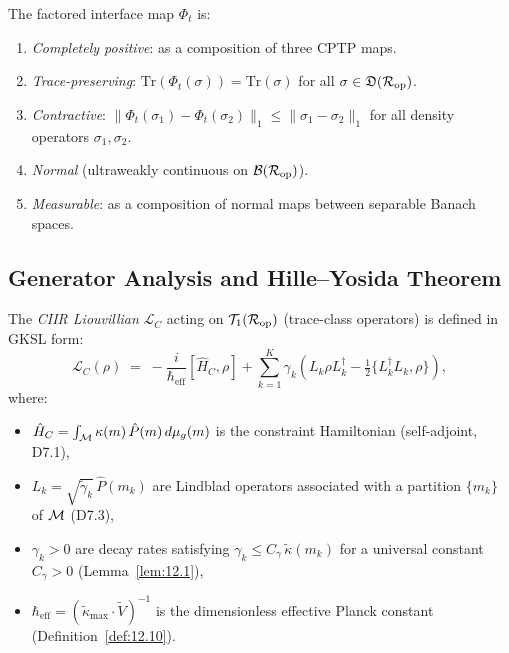 \begin{definition}\label{def:12.2}
The factored interface map $\Phi_t$ is:
\begin{enumerate}
  \item \emph{Completely positive}: as a composition of three CPTP maps.
  \item \emph{Trace-preserving}: $\mathrm{Tr}(\Phi_t(\sigma)) = \mathrm{Tr}(\sigma)$
    for all $\sigma \in \mathfrak{D}(\mathcal{R}_{\mathrm{op}})$.
  \item \emph{Contractive}: $\|\Phi_t(\sigma_1) - \Phi_t(\sigma_2)\|_1
    \leq \|\sigma_1 - \sigma_2\|_1$ for all density operators $\sigma_1, \sigma_2$.
  \item \emph{Normal} (ultraweakly continuous on $\mathcal{B}(\mathcal{R}_{\mathrm{op}})$).
  \item \emph{Measurable}: as a composition of normal maps between
    separable Banach spaces.
\end{enumerate}
\end{definition}

\subsection{Generator Analysis and Hille--Yosida Theorem}

\begin{definition}\label{def:12.3}
The \emph{CIIR Liouvillian} $\mathcal{L}_C$ acting on $\mathcal{T}_1(\mathcal{R}_{\mathrm{op}})$
(trace-class operators) is defined in GKSL form:
\begin{equation}\label{eq:gksl}
  \mathcal{L}_C(\rho) \;=\;
  -\frac{i}{\hbar_{\mathrm{eff}}}[\hat{H}_C, \rho]
  + \sum_{k=1}^{K} \gamma_k\!\left(
    L_k \rho L_k^\dagger - \tfrac{1}{2}\{L_k^\dagger L_k, \rho\}
  \right),
\end{equation}
where:
\begin{itemize}
  \item $\hat{H}_C = \int_{\mathcal{M}} \kappa(m)\,\hat{P}(m)\,d\mu_g(m)$ is the constraint
    Hamiltonian (self-adjoint, D7.1),
  \item $L_k = \sqrt{\tilde{\gamma}_k}\,\hat{P}(m_k)$ are Lindblad operators
    associated with a partition $\{m_k\}$ of $\mathcal{M}$ (D7.3),
  \item $\gamma_k > 0$ are decay rates satisfying
    $\gamma_k \leq C_\gamma\,\tilde{\kappa}(m_k)$ for a universal constant
    $C_\gamma > 0$ (Lemma~\ref{lem:12.1}),
  \item $\hbar_{\mathrm{eff}} = (\tilde{\kappa}_{\max} \cdot \tilde{V})^{-1}$ is
    the dimensionless effective Planck constant (Definition~\ref{def:12.10}).
\end{itemize}
\end{definition}

